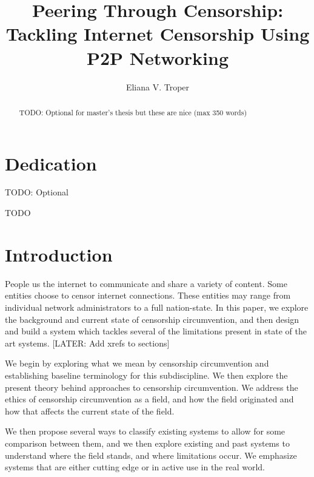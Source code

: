 \documentclass[12pt]{report}
\title{Peering Through Censorship:\\Tackling Internet Censorship Using P2P Networking}
\author{Eliana V. Troper}
\begin{document}

\maketitle    %

\begin{abstract}
TODO: Optional for master's thesis but these are nice (max 350 words)
\end{abstract}


\chapter*{Dedication}

TODO: Optional


TODO

\tableofcontents

\listoffigures  %
\listoftables   %

\newpage


\chapter{Introduction}

People us the internet to communicate and share a variety of content. Some entities choose to censor internet connections. These entities may range from individual network administrators to a full nation-state. In this paper, we explore the background and current state of censorship circumvention, and then design and build a system which tackles several of the limitations present in state of the art systems. [LATER: Add xrefs to sections]

We begin by exploring what we mean by censorship circumvention and establishing baseline terminology for this subdiscipline. We then explore the present theory behind approaches to censorship circumvention. We address the ethics of censorship circumvention as a field, and how the field originated and how that affects the current state of the field.

We then propose several ways to classify existing systems to allow for some comparison between them, and we then explore existing and past systems to understand where the field stands, and where limitations occur. We emphasize systems that are either cutting edge or in active use in the real world.
\end{document}
